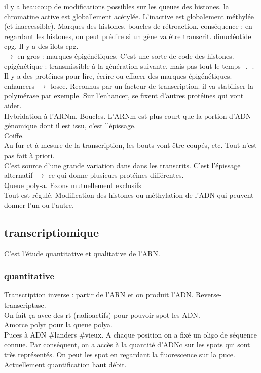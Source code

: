 \documentclass[10pt,a4paper]{article}
\begin{document}
il y a beaucoup de modifications possibles sur les queues des histones. la chromatine active est globallement acétylée. L'inactive est globalement méthylée (et inaccessible). Marques des histones. boucles de rétroaction. conséquence : en regardant les histones, on peut prédire si un gène va être transcrit. dinucléotide cpg. Il y a des îlots cpg.\\
$\rightarrow$ en gros : marques épigénétiques. C'est une sorte de code des histones. epigénétique : transmissible à la génération suivante, mais pas tout le temps -.- .\\
Il y a des protéines pour lire, écrire ou effacer des marques épigénétiques.\\
enhancers $\rightarrow$ tosee. Reconnus par un facteur de transcription. il va stabiliser la polymérase par exemple. Sur l'enhancer, se fixent d'autres protéines qui vont aider. \\
Hybridation à l'ARNm. Boucles. L'ARNm est plus court que la portion d'ADN génomique dont il est issu, c'est l'épissage.\\
Coiffe.\\
Au fur et à mesure de la transcription, les bouts vont être coupés, etc. Tout n'est pas fait à priori.\\
C'est source d'une grande variation dans dans les transcrits. C'est l'épissage alternatif $\rightarrow$ ce qui donne plusieurs protéines différentes.\\
Queue poly-a. Exons mutuellement exclusifs\\
Tout est régulé. Modification des histones ou méthylation de l'ADN qui peuvent donner l'un ou l'autre.\\

\subsection{transcriptiomique}
C'est l'étude quantitative et qualitative de l'ARN.\\
\subsubsection{quantitative}
Transcription inverse : partir de l'ARN et on produit l'ADN. Reverse-transcriptase.\\
On fait ça avec des rt (radioactifs) pour pouvoir spot les ADN.\\
Amorce polyt pour la queue polya.\\
Puces à ADN \#landers \#vieux. A chaque position on a fixé un oligo de séquence connue. Par conséquent, on a accès à la quantité d'ADNc sur les spots qui sont très représentés. On peut les spot en regardant la fluorescence sur la puce.\\
Actuellement quantification haut débit.
\end{document}
